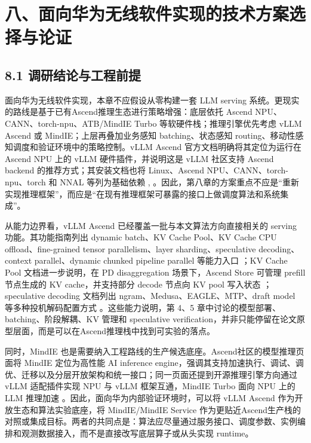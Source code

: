 \clearpage
{}
\section*{八、面向华为无线软件实现的技术方案选择与论证}

\subsection*{8.1 调研结论与工程前提}

面向华为无线软件实现，本章不应假设从零构建一套 LLM serving 系统。更现实的路线是基于已有Ascend推理生态进行策略增强：底层依托 Ascend NPU、CANN、torch-npu、ATB/MindIE Turbo 等软硬件栈；推理引擎优先考虑 vLLM Ascend 或 MindIE；上层再叠加业务感知 batching、状态感知 routing、移动性感知调度和验证环境中的策略控制。vLLM Ascend 官方文档明确将其定位为运行在 Ascend NPU 上的 vLLM 硬件插件，并说明这是 vLLM 社区支持 Ascend backend 的推荐方式；其安装文档也将 Linux、Ascend NPU、CANN、torch-npu、torch 和 NNAL 等列为基础依赖 , 。因此，第八章的方案重点不应是“重新实现推理框架”，而应是“在现有推理框架可暴露的接口上做调度算法和系统集成”。

从能力边界看，vLLM Ascend 已经覆盖一批与本文算法方向直接相关的 serving 功能。其功能指南列出 dynamic batch、KV Cache Pool、KV Cache CPU offload、fine-grained tensor parallelism、layer sharding、speculative decoding、context parallel、dynamic chunked pipeline parallel 等能力入口 ；KV Cache Pool 文档进一步说明，在 PD disaggregation 场景下，Ascend Store 可管理 prefill 节点生成的 KV cache，并支持部分 decode 节点向 KV pool 写入状态 ；speculative decoding 文档列出 ngram、Medusa、EAGLE、MTP、draft model 等多种投机解码配置方式 。这些能力说明，第 4、5 章中讨论的模型部署、batching、阶段解耦、KV 管理和 speculative verification，并非只能停留在论文原型层面，而是可以在Ascend推理栈中找到可实验的落点。

同时，MindIE 也是需要纳入工程路线的生产候选底座。Ascend社区的模型推理页面将 MindIE 定位为高性能 AI inference engine，强调其支持加速执行、调试、调优、迁移以及分层开放架构和统一接口；同一页面还提到开源推理引擎方向通过 vLLM 适配插件实现 NPU 与 vLLM 框架互通，MindIE Turbo 面向 NPU 上的 LLM 推理加速 。因此，面向华为内部验证环境时，可以将 vLLM Ascend 作为开放生态和算法实验底座，将 MindIE/MindIE Service 作为更贴近Ascend生产栈的对照或集成目标。两者的共同点是：算法应尽量通过服务接口、调度参数、实例编排和观测数据接入，而不是直接改写底层算子或从头实现 runtime。

